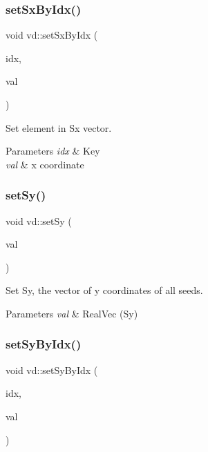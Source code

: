 \subsubsection{\texorpdfstring{set\+Sx\+By\+Idx()}{setSxByIdx()}}
{\footnotesize\ttfamily void vd\+::set\+Sx\+By\+Idx (\begin{DoxyParamCaption}\item[{\mbox{\hyperlink{typedefs_8h_a8ad23e2333787a214e20a58a284a5a60}{uint32}}}]{idx,  }\item[{\mbox{\hyperlink{typedefs_8h_a58a0c7cf2501f4492da833421be92547}{real}}}]{val }\end{DoxyParamCaption})}



Set element in Sx vector. 


\begin{DoxyParams}{Parameters}
{\em idx} & Key \\
\hline
{\em val} & x coordinate \\
\hline
\end{DoxyParams}
\mbox{\label{classvd_a04c6f1cda87a3d18d8dfd67b9bf5f843}} 
\subsubsection{\texorpdfstring{set\+Sy()}{setSy()}}
{\footnotesize\ttfamily void vd\+::set\+Sy (\begin{DoxyParamCaption}\item[{\mbox{\hyperlink{typedefs_8h_a84b6d9a0fbb45e01ad4a3aa5667f2992}{Real\+Vec}}}]{val }\end{DoxyParamCaption})}



Set Sy, the vector of y coordinates of all seeds. 


\begin{DoxyParams}{Parameters}
{\em val} & Real\+Vec (Sy) \\
\hline
\end{DoxyParams}
\mbox{\label{classvd_a5407f9c20ed4ff2300ccbebb999d1dde}} 
\subsubsection{\texorpdfstring{set\+Sy\+By\+Idx()}{setSyByIdx()}}
{\footnotesize\ttfamily void vd\+::set\+Sy\+By\+Idx (\begin{DoxyParamCaption}\item[{\mbox{\hyperlink{typedefs_8h_a8ad23e2333787a214e20a58a284a5a60}{uint32}}}]{idx,  }\item[{\mbox{\hyperlink{typedefs_8h_a58a0c7cf2501f4492da833421be92547}{real}}}]{val }\end{DoxyParamCaption})}



